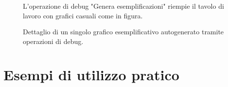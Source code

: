 \begin{figure}[ht!]
    \centering
    \caption{L'operazione di debug "Genera esemplificazioni" riempie il tavolo di lavoro con grafici casuali come in figura.}
    \label{fig:esempio}
\end{figure}

\begin{figure}[ht!]
    \centering
    \caption{Dettaglio di un singolo grafico esemplificativo autogenerato tramite operazioni di debug.}
    \label{fig:esempio}
\end{figure}

\section{Esempi di utilizzo pratico}
